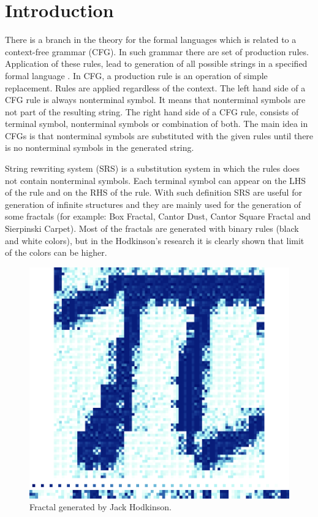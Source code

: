 \documentclass{llncs}
\begin{document}
\section{Introduction} \label{Introduction}

There is a branch in the theory for the formal languages which is related to a context-free grammar (CFG). In such grammar there are set of production rules. Application of these rules, lead to generation of all possible strings in a specified formal language \cite{ochoa01}. In CFG, a production rule is an operation of simple replacement. Rules are applied regardless of the context. The left hand side of a CFG rule is always nonterminal symbol. It means that nonterminal symbols are not part of the resulting string. The right hand side of a CFG rule, consists of terminal symbol, nonterminal symbols or combination of both. The main idea in CFGs is that nonterminal symbols are substituted with the given rules until there is no nonterminal symbols in the generated string.

String rewriting system (SRS) is a substitution system in which the rules does not contain nonterminal symbols. Each terminal symbol can appear on the LHS of the rule and on the RHS of the rule. With such definition SRS are useful for generation of infinite structures and they are mainly used for the generation of some fractals (for example: Box Fractal, Cantor Dust, Cantor Square Fractal and Sierpinski Carpet). Most of the fractals are generated with binary rules (black and white colors), but in the Hodkinson's research it is clearly shown that limit of the colors can be higher.

\begin{figure}[h!]
  \centering
  \includegraphics[width=1.0\linewidth]{pic01}
  \caption{Fractal generated by Jack Hodkinson.}
\label{fig:pic01}
\end{figure}
\end{document}
